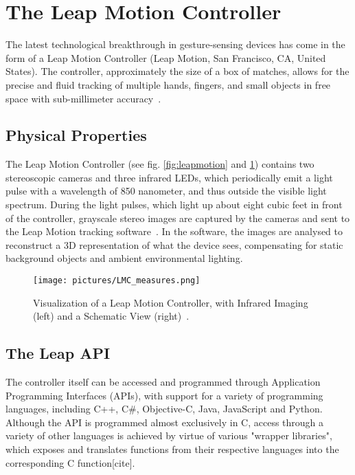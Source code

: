 \section{The Leap Motion Controller}
The latest technological breakthrough in gesture-sensing devices has come in the form of a Leap Motion Controller (Leap Motion, San Francisco, CA, United States). The controller, approximately the size of a box of matches, allows for the precise and fluid tracking of multiple hands, fingers, and small objects in free space with sub-millimeter accuracy~\citep{Guna2014}.

\subsection{Physical Properties}
The Leap Motion Controller (see fig. \ref{fig:leapmotion} and \ref{fig:leapmotion2}) contains two stereoscopic cameras and three infrared LEDs, which periodically emit a light pulse with a wavelength of 850 nanometer, and thus outside the visible light spectrum. During the light pulses, which light up about eight cubic feet in front of the controller, grayscale stereo images are captured by the cameras and sent to the Leap Motion tracking software~\citep{LeapMotion2016}. In the software, the images are analysed to reconstruct a 3D representation of what the device sees, compensating for static background objects and ambient environmental lighting. 

\begin{figure}%
	\texttt{[image: pictures/LMC\_measures.png]}
	\caption[Visualization of a Leap Motion Controller]{Visualization of a Leap Motion Controller, with Infrared Imaging (left) and a Schematic View (right)~\citep{Weichert2013}.}
	\label{fig:leapmotion2}
\end{figure} 

\subsection{The Leap API}
The controller itself can be accessed and programmed through Application Programming Interfaces (APIs), with support for a variety of programming languages, including C++, C\#, Objective-C, Java, JavaScript and Python. Although the API is programmed almost exclusively in C, access through a variety of other languages is achieved by virtue of various "wrapper libraries", which exposes and translates functions from their respective languages into the corresponding C function[cite].

